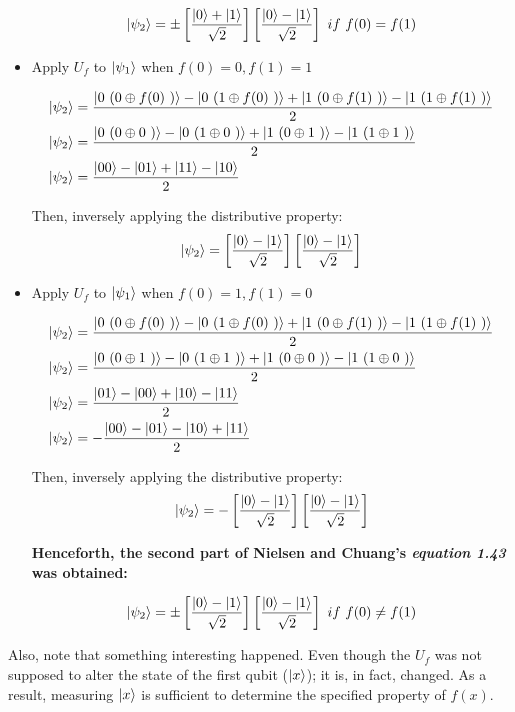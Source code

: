 \begin{itemize}
    \[
    \ket{\psi_2} = \pm \left[ \frac{\ket{0} + \ket{1}}{\sqrt{2}} \right]
        \left[ \frac{\ket{0} - \ket{1}}{\sqrt{2}} \right]\ if \ f(0) = f(1)
    \]
    
    \item Apply \(U_f\) to \(\ket{\psi_1}\) when \(f(0) = 0, f(1) = 1\)
    
        \begin{align}
        \ket{\psi_2} &= \frac{\ket{0\ (0 \oplus f(0)\ )} - \ket{0\ (1 \oplus f(0)\ )} +
        \ket{1\ (0 \oplus f(1)\ )} - \ket{1\ (1 \oplus f(1)\ )}}{2}
        \\
        \ket{\psi_2} &=  \frac{\ket{0\ (0 \oplus 0\ )} - \ket{0\ (1 \oplus 0\ )} +
        \ket{1\ (0 \oplus 1\ )} - \ket{1\ (1 \oplus 1\ )}}{2}
        \\
        \ket{\psi_2} &= \frac{\ket{00} - \ket{01} + \ket{11} - \ket{10}}{2}
    \end{align}
    
    Then, inversely applying the distributive property:
    \begin{equation}
        \ket{\psi_2} =
        \left[ \frac{\ket{0} - \ket{1}}{\sqrt{2}} \right]
        \left[ \frac{\ket{0} - \ket{1}}{\sqrt{2}} \right]
    \end{equation}
    
    \item Apply \(U_f\) to \(\ket{\psi_1}\) when \(f(0) = 1, f(1) = 0\)
    
        \begin{align}
        \ket{\psi_2} &= \frac{\ket{0\ (0 \oplus f(0)\ )} - \ket{0\ (1 \oplus f(0)\ )} +
        \ket{1\ (0 \oplus f(1)\ )} - \ket{1\ (1 \oplus f(1)\ )}}{2}
        \\
        \ket{\psi_2} &=  \frac{\ket{0\ (0 \oplus 1\ )} - \ket{0\ (1 \oplus 1\ )} +
        \ket{1\ (0 \oplus 0\ )} - \ket{1\ (1 \oplus 0\ )}}{2}
        \\
        \ket{\psi_2} &= \frac{\ket{01} - \ket{00} + \ket{10} - \ket{11}}{2}
        \\
        \ket{\psi_2} &= - \frac{\ket{00} - \ket{01} - \ket{10} + \ket{11}}{2}
    \end{align}
    
    Then, inversely applying the distributive property:
    \begin{equation}
        \ket{\psi_2} = -
        \left[ \frac{\ket{0} - \ket{1}}{\sqrt{2}} \right]
        \left[ \frac{\ket{0} - \ket{1}}{\sqrt{2}} \right]
    \end{equation}
    
    \textbf{Henceforth, the second part of Nielsen and Chuang's \emph{equation 1.43} was obtained:}
    
    \[
    \ket{\psi_2} = \pm \left[ \frac{\ket{0} - \ket{1}}{\sqrt{2}} \right]
        \left[ \frac{\ket{0} - \ket{1}}{\sqrt{2}} \right]\ if \ f(0) \neq f(1)
    \]
\end{itemize}

Also, note that something interesting happened. Even though the \(U_f\) was not supposed to alter the state of the first qubit (\(\ket{x}\)); it is, in fact, changed. As a result, measuring \(\ket{x}\) is sufficient to determine the specified property of \(f(x)\).
